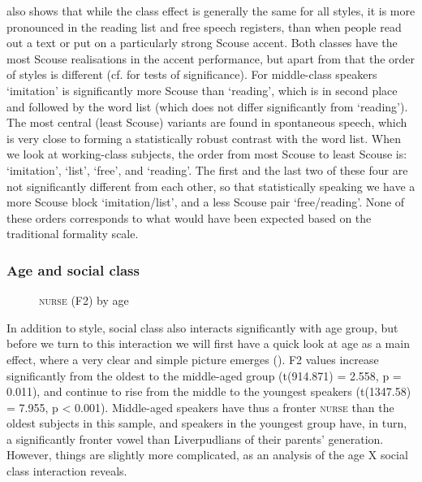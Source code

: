  also shows that while the class effect is generally the same for all styles, it is more pronounced in the reading list and free speech registers, than when people read out a text or put on a particularly strong Scouse accent.
Both classes have the most Scouse realisations in the accent performance, but apart from that the order of styles is different (cf.  for tests of significance).
For middle-class speakers `imitation' is significantly more Scouse than `reading', which is in second place and followed by the word list (which does not differ significantly from `reading').
The most central (least Scouse) variants are found in spontaneous speech, which is very close to forming a statistically robust contrast with the word list.
When we look at working-class subjects, the order from most Scouse to least Scouse is: `imitation', `list', `free', and `reading'.
The first and the last two of these four are not significantly different from each other, so that statistically speaking we have a more Scouse block `imitation/list', and a less Scouse pair `free/reading'.
None of these orders corresponds to what would have been expected based on the traditional formality scale.

\subsubsection{Age and social class}
\label{sec.prod.res.vow.nurse.f2.styleage}

\begin{figure}
	
		\resizebox{0.5\linewidth}{!}{} 
	\caption{\textsc{nurse} (F2) by age}
	\label{fig.box.f2.nurse.tot}
\end{figure}

In addition to style, social class also interacts significantly with age group, but before we turn to this interaction we will first have a quick look at age as a main effect, where a very clear and simple picture emerges ().
F2 values increase significantly from the oldest to the middle-aged group (t(914.871) = 2.558, p = 0.011), and continue to rise from the middle to the youngest speakers (t(1347.58) = 7.955, p < 0.001).
Middle-aged speakers have thus a fronter \textsc{nurse} than the oldest subjects in this sample, and speakers in the youngest group have, in turn, a significantly fronter vowel than Liverpudlians of their parents' generation.
However, things are slightly more complicated, as an analysis of the age X social class interaction reveals.

